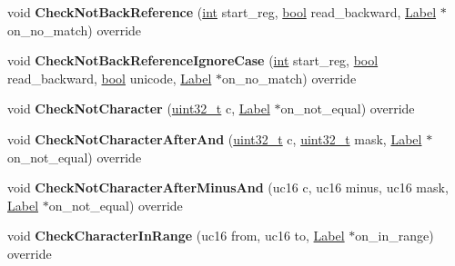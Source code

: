 \begin{DoxyCompactItemize}
\mbox{\label{classv8_1_1internal_1_1RegExpMacroAssemblerX64_a1066ce6f2f21aad1610bcbddf6b6c498}} 
void {\bfseries Check\+Not\+Back\+Reference} (\mbox{\hyperlink{classint}{int}} start\+\_\+reg, \mbox{\hyperlink{classbool}{bool}} read\+\_\+backward, \mbox{\hyperlink{classv8_1_1internal_1_1Label}{Label}} $\ast$on\+\_\+no\+\_\+match) override
\item 
\mbox{\label{classv8_1_1internal_1_1RegExpMacroAssemblerX64_ac293d0b5e6363aab8b29a35cac574d41}} 
void {\bfseries Check\+Not\+Back\+Reference\+Ignore\+Case} (\mbox{\hyperlink{classint}{int}} start\+\_\+reg, \mbox{\hyperlink{classbool}{bool}} read\+\_\+backward, \mbox{\hyperlink{classbool}{bool}} unicode, \mbox{\hyperlink{classv8_1_1internal_1_1Label}{Label}} $\ast$on\+\_\+no\+\_\+match) override
\item 
\mbox{\label{classv8_1_1internal_1_1RegExpMacroAssemblerX64_ab0d753ac0c9d093f5f28be4a9dbe253a}} 
void {\bfseries Check\+Not\+Character} (\mbox{\hyperlink{classuint32__t}{uint32\+\_\+t}} c, \mbox{\hyperlink{classv8_1_1internal_1_1Label}{Label}} $\ast$on\+\_\+not\+\_\+equal) override
\item 
\mbox{\label{classv8_1_1internal_1_1RegExpMacroAssemblerX64_ab9266c33d15441d67776af457ce30ddc}} 
void {\bfseries Check\+Not\+Character\+After\+And} (\mbox{\hyperlink{classuint32__t}{uint32\+\_\+t}} c, \mbox{\hyperlink{classuint32__t}{uint32\+\_\+t}} mask, \mbox{\hyperlink{classv8_1_1internal_1_1Label}{Label}} $\ast$on\+\_\+not\+\_\+equal) override
\item 
\mbox{\label{classv8_1_1internal_1_1RegExpMacroAssemblerX64_a81643ef1d70b1727b1977b6190920f8d}} 
void {\bfseries Check\+Not\+Character\+After\+Minus\+And} (uc16 c, uc16 minus, uc16 mask, \mbox{\hyperlink{classv8_1_1internal_1_1Label}{Label}} $\ast$on\+\_\+not\+\_\+equal) override
\item 
\mbox{\label{classv8_1_1internal_1_1RegExpMacroAssemblerX64_a69d184b0938c0f4bbd7210530ffdb0b7}} 
void {\bfseries Check\+Character\+In\+Range} (uc16 from, uc16 to, \mbox{\hyperlink{classv8_1_1internal_1_1Label}{Label}} $\ast$on\+\_\+in\+\_\+range) override

\end{DoxyCompactItemize}
